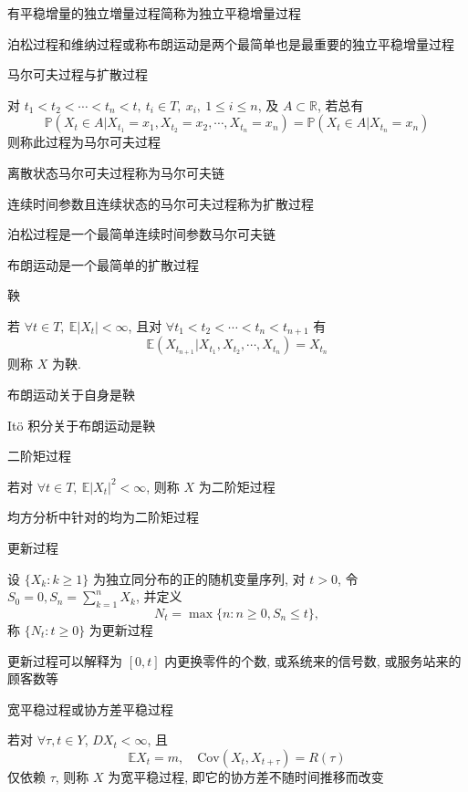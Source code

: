 \documentclass[openany]{ctexbook}
\theoremstyle{kaiti}
\theoremstyle{normal}
\begin{document}
有平稳增量的独立増量过程简称为独立平稳增量过程

泊松过程和维纳过程或称布朗运动是两个最简单也是最重要的独立平稳增量过程

马尔可夫过程与扩散过程

对 $t_1<t_2<\cdots<t_n<t,~t_i\in T,~x_i,~1\leqslant i\leqslant n$, 及 $A\subset\mathbb{R}$, 若总有
\begin{equation}
  \mathbb{P}(X_t\in A|X_{t_1}=x_1,X_{t_2}=x_2,\cdots,X_{t_n}=x_n)=\mathbb{P}(X_t\in A|X_{t_n}=x_n)
\end{equation}
则称此过程为马尔可夫过程

离散状态马尔可夫过程称为马尔可夫链

连续时间参数且连续状态的马尔可夫过程称为扩散过程

泊松过程是一个最简单连续时间参数马尔可夫链

布朗运动是一个最简单的扩散过程

鞅

若 $\forall t\in T,~\mathbb{E}|X_t|<\infty$, 且对 $\forall t_1<t_2<\cdots<t_n<t_{n+1}$ 有
\begin{equation}
  \mathbb{E}(X_{t_{n+1}}|X_{t_1},X_{t_2},\cdots,X_{t_n})=X_{t_n}
\end{equation}
则称 $X$ 为鞅.

布朗运动关于自身是鞅

 It\"o 积分关于布朗运动是鞅

二阶矩过程

若对 $\forall t\in T,~\mathbb{E}|X_t|^2<\infty$, 则称 $X$ 为二阶矩过程

均方分析中针对的均为二阶矩过程

更新过程

设 $\{X_k:k\geqslant1\}$ 为独立同分布的正的随机变量序列, 对 $t>0$, 令 $S_0=0, S_n=\sum_{k=1}^nX_k$, 并定义
\begin{equation}
  N_t=\max\{n:n\geqslant0,S_n\leqslant t\},
\end{equation}
称 $\{N_t:t\geqslant0\}$ 为更新过程

更新过程可以解释为 $[0,t]$ 内更换零件的个数, 或系统来的信号数, 或服务站来的顾客数等

宽平稳过程或协方差平稳过程

若对 $\forall\tau,t\in Y$, $DX_t<\infty$, 且
\begin{equation}
  \mathbb{E}X_t=m,\quad\mathrm{Cov}(X_t,X_{t+\tau})=R(\tau)
\end{equation}
仅依赖 $\tau$, 则称 $X$ 为宽平稳过程, 即它的协方差不随时间推移而改变
\end{document}
